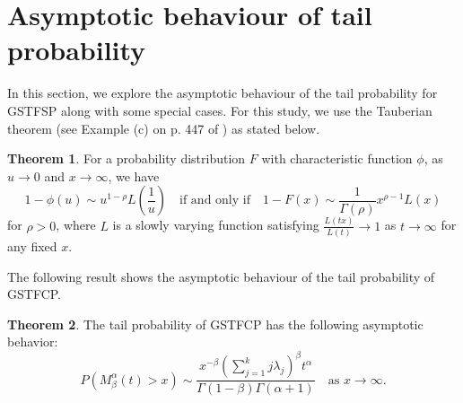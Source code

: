 \documentclass[11pt,oneside,reqno]{amsart}
\theoremstyle{definition}
\newtheorem{theorem}{\bf Theorem}[section]
\theoremstyle{remarkstyle}
\begin{document}
\section{Asymptotic behaviour of tail probability}\label{sec 7}
In this section, we explore the asymptotic behaviour of the tail probability for GSTFSP along with some special cases. For this study, we use the Tauberian theorem (see  Example (c) on p. 447 of \citet{WilliamF2008}) as stated below. 
\begin{theorem}\label{Tauberian_theorem}
For a probability distribution $F$ with characteristic function $\phi$, as $u\rightarrow 0$ and $x\rightarrow\infty$, we have
\begin{equation}
1-\phi(u)\sim u^{1-\rho}L(\frac{1}{u}) \quad \text{if and only if}\quad 1-F(x)\sim\frac{1}{\Gamma(\rho)}x^{\rho-1}L(x)
\end{equation}
for $\rho>0$, where $L$ is a slowly varying function satisfying $\frac{L(tx)}{L(t)}\to 1$ as $t\to \infty$ for any fixed $x$.    
\end{theorem}
The following result shows the asymptotic behaviour of the tail probability of GSTFCP.
\begin{theorem}\label{Asymptotic_GSTFCP}
    The tail probability of GSTFCP has the following asymptotic behavior:
    \begin{equation*}
        P(M_{\beta}^{\alpha}(t)>x)\sim\frac{x^{-\beta} (\sum_{j=1}^{k}j\lambda_j)^{\beta}t^{\alpha}}{\Gamma(1-\beta)\Gamma(\alpha+1)} \quad\text{as}\,\, x\to \infty.
    \end{equation*}
\end{theorem}
\end{document}
